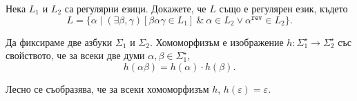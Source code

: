\begin{problem}
  Нека $L_1$ и $L_2$ са регулярни езици. Докажете, че $L$ също е регулярен език, където
  \[L = \{\alpha \mid (\exists \beta,\gamma)[\beta\alpha\gamma \in L_1]\ \&\ \alpha \in L_2 \vee \alpha^{\texttt{rev}} \in L_2\}.\]
\end{problem}

\begin{definition}
  Да фиксираме две азбуки $\Sigma_1$ и $\Sigma_2$.
  Хомоморфизъм е изображение $h:\Sigma^\star_1 \to \Sigma^\star_2$ със свойството, че
  за всеки две думи $\alpha,\beta\in\Sigma^\star_1$,
  \[h(\alpha\beta) = h(\alpha)\cdot h(\beta).\]
\end{definition}

Лесно се съобразява, че за всеки хомоморфизъм $h$, $h(\varepsilon) = \varepsilon$.

